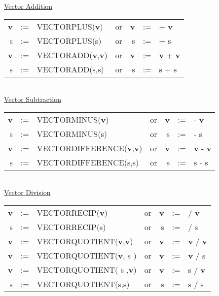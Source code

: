 \newpage
\underline{Vector Addition} \\
  
\begin{tabular}{rclcrcl}
{\bf v} &:=& VECTORPLUS({\bf v})  &{\rm or}& {\bf v} &:=&  +  {\bf v} \\
     s  &:=& VECTORPLUS(s)  &{\rm or} &      s  &:=&  +       s  \\
{\bf v} &:=& VECTORADD({\bf v},{\bf v})  &{\rm or }& {\bf v} &:=&  
{\bf v} +  {\bf v} \\
     s  &:=& VECTORADD(s,s)  &{\rm or }&      s  &:=&  s + s \\
\end{tabular} \\

\underline{Vector Subtraction} \\
  
\begin{tabular}{rclcrcl}
{\bf v} &:=& VECTORMINUS({\bf v})  &{\rm or}&
 {\bf v} &:=&  -  {\bf v} \\
 s  &:=& VECTORMINUS(s)  &{\rm or} &      s  &:=&  -       s  \\
{\bf v} &:=& VECTORDIFFERENCE({\bf v},{\bf v})  &{\rm or }& {\bf v} &:=&
  {\bf v} -  {\bf v} \\
 s  &:=& VECTORDIFFERENCE(s,s)  &{\rm or }&      s  &:=&  s - s \\
\end{tabular} \\

\underline{Vector Division}\\
  
\begin{tabular}{rclcrcl}
{\bf v} &:=& VECTORRECIP({\bf v})  &{\rm or}& {\bf v} &:=&  /  
{\bf v} \\
 s  &:=& VECTORRECIP(s)  &{\rm or} &      s  &:=&  /       s  \\
{\bf v} &:=& VECTORQUOTIENT({\bf v},{\bf v})  &{\rm or }& {\bf v} &:=&  
{\bf v} /  {\bf v} \\
{\bf v} &:=& VECTORQUOTIENT({\bf v},    s  )  &{\rm or }& {\bf v} &:=&  
{\bf v} /     s    \\
{\bf v} &:=& VECTORQUOTIENT(   s   ,{\bf v})  &{\rm or }& {\bf v} &:=&  
   s    /  {\bf v} \\
     s  &:=& VECTORQUOTIENT(s,s)  &{\rm or }&      s  &:=&  s / s       
       \\
\end{tabular} \\

